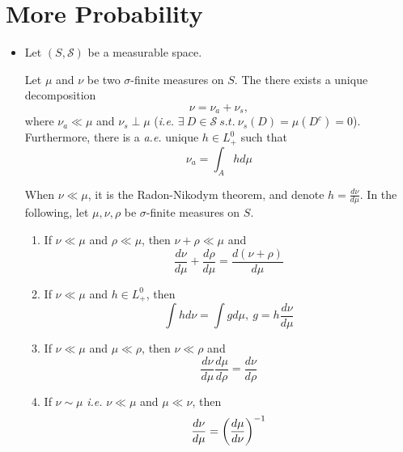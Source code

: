 \documentclass[a4paper,12pt]{article}
\begin{document}
\section{More Probability}
\begin{itemize}
  \item Let $(S, \mathcal{S})$ be a measurable space.
  \begin{thm}
    Let $\mu$ and $\nu$ be two $\sigma$-finite measures on $S$. The there exists a unique decomposition
    \begin{equation*}
      \nu = \nu_a + \nu_s,
    \end{equation*}
    where $\nu_a \ll \mu$ and $\nu_s \perp \mu$ (\emph{i.e.} $\exists~D \in \mathcal{S}~s.t.~\nu_s(D)=\mu(D^c)=0$). Furthermore, there is a \emph{a.e.} unique $h \in L^0_+$ such that
    \begin{equation*}
      \nu_a = \int_Ahd\mu
    \end{equation*}
  \end{thm}
  When $\nu \ll \mu$, it is the Radon-Nikodym theorem, and denote $h = \frac{d\nu}{d\mu}$. In the following, let $\mu,\nu,\rho$ be $\sigma$-finite measures on $S$.
  \begin{enumerate}[label=(\arabic*)]
    \item If $\nu \ll \mu$ and $\rho \ll \mu$, then $\nu + \rho \ll \mu$ and
    \begin{equation*}
      \frac{d\nu}{d\mu} + \frac{d\rho}{d\mu} = \frac{d(\nu + \rho)}{d\mu}
    \end{equation*}

    \item If $\nu \ll \mu$ and $h \in L_+^0$, then
    \begin{equation*}
      \int h d\nu = \int g d\mu,~g = h\frac{d\nu}{d\mu}
    \end{equation*}

    \item If $\nu \ll \mu$ and $\mu \ll \rho$, then $\nu \ll \rho$ and
    \begin{equation*}
      \frac{d\nu}{d\mu}\frac{d\mu}{d\rho} = \frac{d\nu}{d\rho}
    \end{equation*}

    \item If $\nu \sim \mu$ \emph{i.e.} $\nu \ll \mu$ and $\mu \ll \nu$, then
    \begin{equation*}
      \frac{d\nu}{d\mu} = \left(\frac{d\mu}{d\nu}\right)^{-1}
    \end{equation*}
  \end{enumerate}


\end{itemize}
\end{document}
